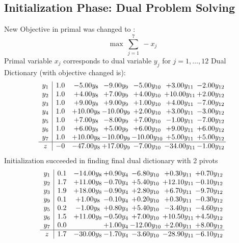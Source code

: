 \documentclass[8pt]{article}
\begin{document}
\subsection{Initialization Phase: Dual Problem Solving}
New Objective in primal was changed to : \[ \max\ \sum_{j=1}^{7}\ - x_j \] 
Primal variable $x_j$ corresponds to dual variable $y_j$ for $j = 1,\ldots,12$
Dual Dictionary (with objective changed is): 
\[\begin{array}{c| c c@{\hskip 2pt} c@{\hskip 2pt} c@{\hskip 2pt} c@{\hskip 2pt} c@{\hskip 2pt} }
 y_{1}   &  1.0 & -5.00 y_{8} & -9.00 y_{9} & -5.00 y_{10} & +  3.00 y_{11} & -2.00 y_{12}\\
 y_{2}   &  1.0 & +  4.00 y_{8} & +  7.00 y_{9} & +  4.00 y_{10} & + 10.00 y_{11} & +  2.00 y_{12}\\
 y_{3}   &  1.0 & +  9.00 y_{8} & +  9.00 y_{9} & +  1.00 y_{10} & +  4.00 y_{11} & -7.00 y_{12}\\
 y_{4}   &  1.0 & + 10.00 y_{8} & -10.00 y_{9} & +  2.00 y_{10} & +  3.00 y_{11} & -3.00 y_{12}\\
 y_{5}   &  1.0 & +  7.00 y_{8} & -8.00 y_{9} & +  7.00 y_{10} & -1.00 y_{11} & -7.00 y_{12}\\
 y_{6}   &  1.0 & +  6.00 y_{8} & +  5.00 y_{9} & +  6.00 y_{10} & +  9.00 y_{11} & +  6.00 y_{12}\\
 y_{7}   &  1.0 & + 10.00 y_{8} & -10.00 y_{9} & -10.00 y_{10} & +  5.00 y_{11} & +  5.00 y_{12}\\
\hline
z    &  -0 & -47.00 y_{8} & + 17.00 y_{9} & -7.00 y_{10} & -34.00 y_{11} & -1.00 y_{12}\\
\end{array}\]
Initialization succeeded in finding final dual dictionary with 2 pivots
\[\begin{array}{c| c c@{\hskip 2pt} c@{\hskip 2pt} c@{\hskip 2pt} c@{\hskip 2pt} c@{\hskip 2pt} }
 y_{1}   &  0.1 & -14.00 y_{8} & +  0.90 y_{4} & -6.80 y_{10} & +  0.30 y_{11} & +  0.70 y_{12}\\
 y_{2}   &  1.7 & + 11.00 y_{8} & -0.70 y_{4} & +  5.40 y_{10} & + 12.10 y_{11} & -0.10 y_{12}\\
 y_{3}   &  1.9 & + 18.00 y_{8} & -0.90 y_{4} & +  2.80 y_{10} & +  6.70 y_{11} & -9.70 y_{12}\\
 y_{9}   &  0.1 & +  1.00 y_{8} & -0.10 y_{4} & +  0.20 y_{10} & +  0.30 y_{11} & -0.30 y_{12}\\
 y_{5}   &  0.2 & -1.00 y_{8} & +  0.80 y_{4} & +  5.40 y_{10} & -3.40 y_{11} & -4.60 y_{12}\\
 y_{6}   &  1.5 & + 11.00 y_{8} & -0.50 y_{4} & +  7.00 y_{10} & + 10.50 y_{11} & +  4.50 y_{12}\\
 y_{7}   &  0.0  &   & +  1.00 y_{4} & -12.00 y_{10} & +  2.00 y_{11} & +  8.00 y_{12}\\
\hline
z    &  1.7 & -30.00 y_{8} & -1.70 y_{4} & -3.60 y_{10} & -28.90 y_{11} & -6.10 y_{12}\\
\end{array}\]
\end{document}
